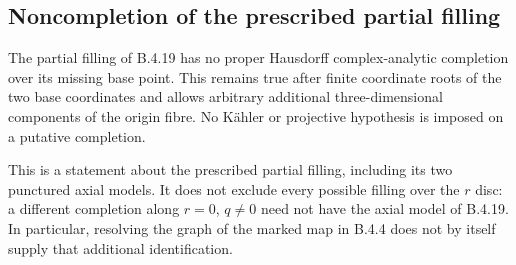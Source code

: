 \subsection{Noncompletion of the prescribed partial filling}

\begin{proposition}
\label{push:B430}
The partial filling of B.4.19 has no proper
Hausdorff complex-analytic completion over its
missing base point. This remains true after finite
coordinate roots of the two base coordinates and
allows arbitrary additional three-dimensional
components of the origin fibre. No K\"ahler or
projective hypothesis is imposed on a putative
completion.

This is a statement about the prescribed partial
filling, including its two punctured axial models.
It does not exclude every possible filling over
the $r$ disc: a different completion along
$r=0$, $q\ne0$ need not have the axial model of
B.4.19. In particular, resolving the graph of the
marked map in B.4.4 does not by itself supply
that additional identification.
\end{proposition}

